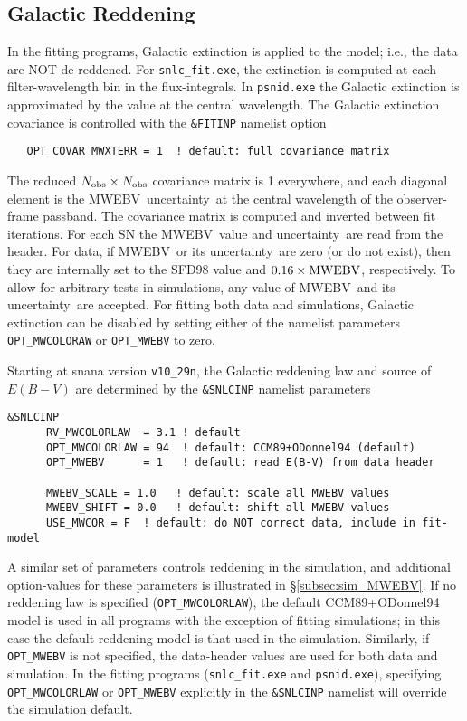 \documentclass[12pt]{article}
\newcommand{\unc}{uncertainty}
\newcommand{\snfitter}{{\tt snlc\_fit.exe}}
\newcommand{\psnid}{{\tt psnid.exe}}
\newcommand{\mwebv}{MWEBV}
\begin{document}
   \clearpage
   \subsection{Galactic Reddening}
   \label{subsec:fit_MWEBV}

In the fitting programs, Galactic extinction is 
applied to the model; i.e., the data are NOT de-reddened.
For {\snfitter}, the extinction is computed at each
filter-wavelength bin in the flux-integrals.
In {\psnid} the Galactic extinction is approximated
by the value at the central wavelength.
The Galactic extinction covariance is controlled with 
the {\tt \&FITINP} namelist option
\begin{verbatim}
   OPT_COVAR_MWXTERR = 1  ! default: full covariance matrix
\end{verbatim}
The reduced $N_{\rm obs}\times N_{\rm obs}$ 
covariance matrix is 1 everywhere, 
and each diagonal element is the \mwebv\ \unc\
at the central wavelength of the observer-frame passband.
The covariance matrix is computed and inverted
between fit iterations.
%
For each SN the \mwebv\ value and \unc\ are read from the header.
For data, if \mwebv\ or its \unc\ are zero (or do not exist),
then they are internally set to the SFD98 value 
and $0.16\times {\rm MWEBV}$, respectively.
To allow for arbitrary tests in simulations, 
any value of \mwebv\ and its \unc\ are accepted.
For fitting both data and simulations, Galactic extinction
can be disabled by setting either of the namelist parameters 
{\tt OPT\_MWCOLORAW} or {\tt OPT\_MWEBV} to zero.

\medskip
Starting at snana version {\tt v10\_29n}, 
the Galactic reddening law and source of $E(B-V)$
are determined by the {\tt \&SNLCINP} namelist parameters
%
\begin{Verbatim}[frame=single]
   &SNLCINP 
      RV_MWCOLORLAW  = 3.1 ! default
      OPT_MWCOLORLAW = 94  ! default: CCM89+ODonnel94 (default)
      OPT_MWEBV      = 1   ! default: read E(B-V) from data header

      MWEBV_SCALE = 1.0   ! default: scale all MWEBV values
      MWEBV_SHIFT = 0.0   ! default: shift all MWEBV values      
      USE_MWCOR = F  ! default: do NOT correct data, include in fit-model 
\end{Verbatim}
%
A similar set of parameters controls reddening in the
simulation, and additional option-values for these parameters
is illustrated in \S\ref{subsec:sim_MWEBV}.
If no reddening law is specified ({\tt OPT\_MWCOLORLAW}), 
the default CCM89+ODonnel94 model is used in all programs 
with the exception of fitting simulations; 
in this case the default reddening model is that 
used in the simulation. 
Similarly, if {\tt OPT\_MWEBV} is not specified, 
the data-header values are used for both data and simulation.
In the fitting programs ({\snfitter} and {\psnid}),
specifying {\tt OPT\_MWCOLORLAW} or {\tt OPT\_MWEBV}
explicitly in the {\tt \&SNLCINP} namelist will 
override the simulation default.
\end{document}
